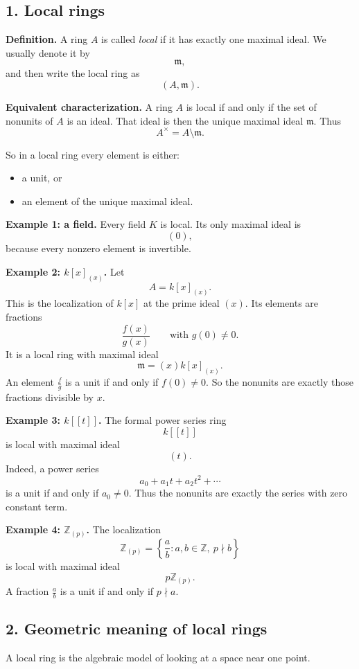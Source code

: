 \documentclass[12pt,a4paper]{article}
\theoremstyle{notespace}
\begin{document}
\subsection*{1. Local rings}

\textbf{Definition.}
A ring \(A\) is called \emph{local} if it has exactly one maximal ideal. We usually denote it by
\[
\mathfrak m,
\]
and then write the local ring as
\[
(A,\mathfrak m).
\]

\textbf{Equivalent characterization.}
A ring \(A\) is local if and only if the set of nonunits of \(A\) is an ideal. That ideal is then the unique maximal ideal \(\mathfrak m\). Thus
\[
A^\times = A\setminus \mathfrak m.
\]

So in a local ring every element is either:
\begin{itemize}
	\item a unit, or
	\item an element of the unique maximal ideal.
\end{itemize}

\textbf{Example 1: a field.}
Every field \(K\) is local. Its only maximal ideal is
\[
(0),
\]
because every nonzero element is invertible.

\textbf{Example 2: \(k[x]_{(x)}\).}
Let
\[
A=k[x]_{(x)}.
\]
This is the localization of \(k[x]\) at the prime ideal \((x)\). Its elements are fractions
\[
\frac{f(x)}{g(x)}
\qquad \text{with } g(0)\neq 0.
\]
It is a local ring with maximal ideal
\[
\mathfrak m=(x)k[x]_{(x)}.
\]
An element \(\frac{f}{g}\) is a unit if and only if \(f(0)\neq 0\). So the nonunits are exactly those fractions divisible by \(x\).

\textbf{Example 3: \(k[[t]]\).}
The formal power series ring
\[
k[[t]]
\]
is local with maximal ideal
\[
(t).
\]
Indeed, a power series
\[
a_0+a_1t+a_2t^2+\cdots
\]
is a unit if and only if \(a_0\neq 0\). Thus the nonunits are exactly the series with zero constant term.

\textbf{Example 4: \(\mathbb Z_{(p)}\).}
The localization
\[
\mathbb Z_{(p)}=\left\{\frac ab : a,b\in \mathbb Z,\ p\nmid b\right\}
\]
is local with maximal ideal
\[
p\mathbb Z_{(p)}.
\]
A fraction \(\frac ab\) is a unit if and only if \(p\nmid a\).

\subsection*{2. Geometric meaning of local rings}

A local ring is the algebraic model of looking at a space near one point.
\end{document}
